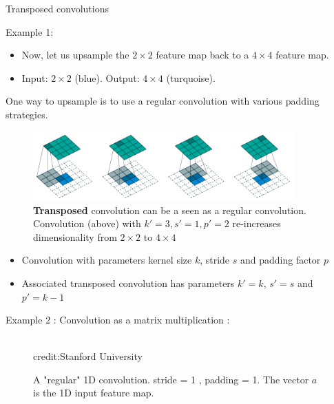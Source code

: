 \begin{vbframe}{Transposed convolutions}
\framebreak

\begin{itemize}
\item Example 1:
        \small{
        \begin{itemize}
        \item Now, let us upsample the $2\times 2$ feature map back to a $4\times 4$ feature map.
        \item Input: $2\times 2$ (blue). Output: $4\times 4$ (turquoise).
        \end{itemize}
\item One way to upsample is to use a regular convolution with various padding strategies.}
\end{itemize}
\begin{figure}
\centering
\includegraphics[width=10cm]{plots/05_conv_variations/transpose/transpose_conv.png}
\caption{\textbf{Transposed} convolution can be a seen as a regular convolution. Convolution (above) with $k' = 3, s' = 1, p' = 2$ re-increases dimensionality from $2\times 2$ to $4\times 4$}
\end{figure}
    
\framebreak

\begin{itemize}
\item Convolution with parameters kernel size $k$, stride $s$ and padding factor $p$
\item Associated transposed convolution has parameters $k' = k$, $s' = s$ and $p' = k-1$
\end{itemize}

\framebreak
Example 2 : Convolution as a matrix multiplication : 
\begin{figure}
\centering
{}
\tiny{\\credit:Stanford University}
\caption{A "regular" 1D convolution. stride = 1 , padding = 1. The vector $a$ is the 1D input feature map. }
\end{figure}
   

\end{vbframe}
